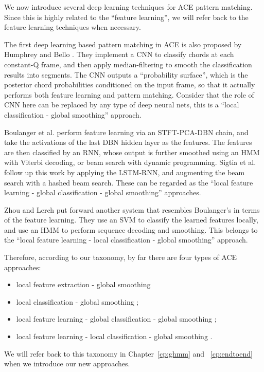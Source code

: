 We now introduce several deep learning techniques for ACE pattern matching. Since this is highly related to the ``feature learning'', we will refer back to the feature learning techniques when necessary.

The first deep learning based pattern matching in ACE is also proposed by Humphrey and Bello \cite{humphrey2012rethinking}. They implement a CNN to classify chords at each constant-Q frame, and then apply median-filtering to smooth the classification results into segments. The CNN outputs a ``probability surface'', which is the posterior chord probabilities conditioned on the input frame, so that it actually performs both feature learning and pattern matching. Consider that the role of CNN here can be replaced by any type of deep neural nets, this is a ``local classification - global smoothing'' approach.

Boulanger et al. \cite{boulanger2013audio} perform feature learning via an STFT-PCA-DBN chain, and take the activations of the last DBN hidden layer as the features. The features are then classified by an RNN, whose output is further smoothed using an HMM with Viterbi decoding, or beam search with dynamic programming. Sigtia et al. \cite{sigtia2015audio} follow up this work by applying the LSTM-RNN, and augmenting the beam search with a hashed beam search. These can be regarded as the ``local feature learning - global classification - global smoothing'' approaches.

Zhou and Lerch \cite{zhou2015chord} put forward another system that resembles Boulanger's in terms of the feature learning. They use an SVM to classify the learned features locally, and use an HMM to perform sequence decoding and smoothing. This belongs to the ``local feature learning - local classification - global smoothing'' approach.

Therefore, according to our taxonomy, by far there are four types of ACE approaches:
\begin{itemize}
	\item local feature extraction - global smoothing \cite{fujishima1999realtime,sheh2003chord}
	\item local classification - global smoothing \cite{humphrey2012rethinking};
	\item local feature learning - global classification - global smoothing \cite{boulanger2013audio,sigtia2015audio};
	\item local feature learning - local classification - global smoothing \cite{zhou2015chord}.
\end{itemize}
We will refer back to this taxonomy in Chapter~\ref{cp:ghmm} and ~\ref{cp:endtoend} when we introduce our new approaches.

